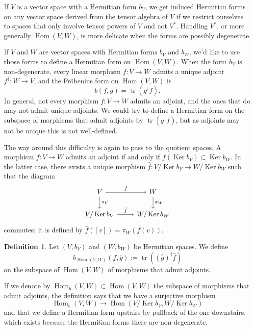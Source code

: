 \documentclass[10pt,a4paper]{amsart}
\theoremstyle{definition}
\newtheorem{defi}[theo]{Definition}
\def\ov#1{\overline{#1}}
\DeclareMathOperator{\Ker}{Ker}
\DeclareMathOperator{\Hom}{Hom}
\DeclareMathOperator{\tr}{tr}
\begin{document}
If $V$ is a vector space with a Hermitian form $b_V$, we get induced Hermitian forms on any vector space derived from the tensor algebra of $V$ if we restrict ourselves to spaces that only involve tensor powers of $V$ and not $V^*$. Handling $V^*$, or more generally $\Hom(V,W)$, is more delicate when the forms are possibly degenerate.



If $V$ and $W$ are vector spaces with Hermitian forms $b_V$ and $b_W$, we'd like to use those forms to define a Hermitian form on $\Hom(V,W)$. When the form $b_V$ is non-degenerate, every linear morphism $f : V \to W$ admits a unique adjoint $f^\dagger : W \to V$, and the Fr\"obenius form on $\Hom(V,W)$ is
\[
b(f, \ov g) = \tr(g^\dagger f).
\]
In general, not every morphism $f : V \to W$ admits an adjoint, and the ones that do may not admit unique adjoints. We could try to define a Hermitian form on the subspace of morphisms that admit adjoints by $\tr(g^\dagger f)$, but as adjoints may not be unique this is not well-defined.

The way around this difficulty is again to pass to the quotient spaces. A morphism $f : V \to W$ admits an adjoint if and only if $f(\Ker b_V) \subset \Ker b_W$. In the latter case, there exists a unique morphism $\hat f : V / \Ker b_V \to W / \Ker b_W$ such that the diagram
\[
\begin{tikzcd}
V \ar[d,"\pi_V"] \ar[r,"f"] & W \ar[d,"\pi_W"]
\\
V / \Ker b_V \ar[r,"\hat f"] & W / \Ker b_W
\end{tikzcd}
\]
commutes; it is defined by $\hat f([v]) = \pi_W(f(v))$.


\begin{defi}
Let $(V,b_V)$ and $(W,b_W)$ be Hermitian spaces. We define
\[
b_{\Hom(V,W)}(f, \ov g) := \tr((\hat g)^\dagger \hat f)
\]
on the subspace of $\Hom(V,W)$ of morphisms that admit adjoints.
\end{defi}

If we denote by $\Hom_b(V,W) \subset \Hom(V,W)$ the subspace of morphisms that admit adjoints, the definition says that we have a surjective morphism
\[
\Hom_b(V,W) \to \Hom(V/\Ker b_V, W/\Ker b_W)
\]
and that we define a Hermitian form upstairs by pullback of the one downstairs, which exists because the Hermitian forms there are non-degenerate.
\end{document}
